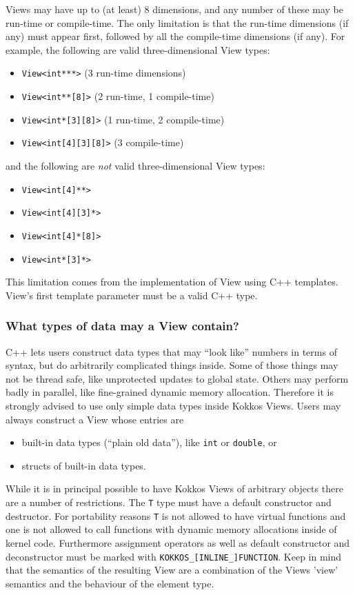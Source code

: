 Views may have up to (at least) 8 dimensions, and any number of these
may be run-time or compile-time.  The only limitation is that the
run-time dimensions (if any) must appear first, followed by all the
compile-time dimensions (if any).  For example, the following are
valid three-dimensional View types:
\begin{itemize}
\item \lstinline!View<int***>!  (3 run-time dimensions)
\item \lstinline!View<int**[8]>!  (2 run-time, 1 compile-time)
\item \lstinline!View<int*[3][8]>!  (1 run-time, 2 compile-time)
\item \lstinline!View<int[4][3][8]>!  (3 compile-time)
\end{itemize}
and the following are \emph{not} valid three-dimensional View types:
\begin{itemize}
\item \lstinline!View<int[4]**>!
\item \lstinline!View<int[4][3]*>!
\item \lstinline!View<int[4]*[8]>!
\item \lstinline!View<int*[3]*>!
\end{itemize}
This limitation comes from the implementation of View using C++
templates.  View's first template parameter must be a valid C++ type.

\subsubsection{What types of data may a View contain?}

C++ lets users construct data types that may ``look like'' numbers in
terms of syntax, but do arbitrarily complicated things inside.  Some
of those things may not be thread safe, like unprotected updates to
global state.  Others may perform badly in parallel, like fine-grained
dynamic memory allocation.  Therefore it is strongly advised to use 
only simple data types inside Kokkos Views.
Users may always construct a View whose entries are 
\begin{itemize}
\item built-in data types (``plain old data''), like \texttt{int} or
  \texttt{double}, or
\item structs of built-in data types.
\end{itemize}

While it is in principal possible to have Kokkos Views of arbitrary 
objects there are a number of restrictions. The \lstinline|T| type 
must have a default constructor and destructor. For portability reasons
\lstinline|T| is not allowed to have virtual functions and one is not 
allowed to call functions with dynamic memory allocations inside of 
kernel code. Furthermore assignment operators as well as default constructor
and deconstructor must be marked with \lstinline|KOKKOS_[INLINE_]FUNCTION|. 
Keep in mind that the semantics of the resulting View are a combination of the 
Views 'view' semantics and the behaviour of the element type.

